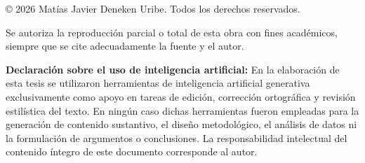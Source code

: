 \thispagestyle{empty}
\noindent © 2026 Matías Javier Deneken Uribe. Todos los derechos reservados.

\vspace{0.6cm}
\noindent Se autoriza la reproducción parcial o total de esta obra con fines
académicos, siempre que se cite adecuadamente la fuente y el autor.

\vspace{0.8cm}
\noindent \textbf{Declaración sobre el uso de inteligencia artificial:} En la
elaboración de esta tesis se utilizaron herramientas de inteligencia artificial
generativa exclusivamente como apoyo en tareas de edición, corrección
ortográfica y revisión estilística del texto. En ningún caso dichas herramientas
fueron empleadas para la generación de contenido sustantivo, el diseño
metodológico, el análisis de datos ni la formulación de argumentos o
conclusiones. La responsabilidad intelectual del contenido íntegro de este
documento corresponde al autor.
\clearpage

